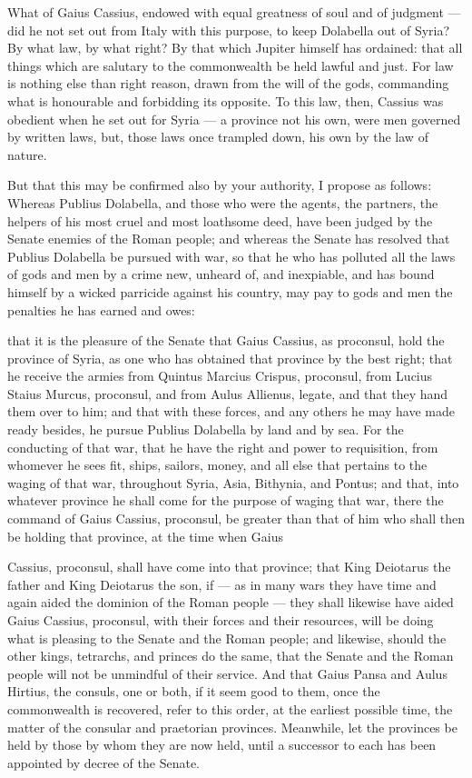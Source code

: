 What of Gaius Cassius, endowed with equal greatness of soul and of judgment --- did he not set out from Italy with this purpose, to keep Dolabella out of Syria? By what law, by what right? By that which Jupiter himself has ordained: that all things which are salutary to the commonwealth be held lawful and just. For law is nothing else than right reason, drawn from the will of the gods, commanding what is honourable and forbidding its opposite. To this law, then, Cassius was obedient when he set out for Syria --- a province not his own, were men governed by written laws, but, those laws once trampled down, his own by the law of nature.

 But that this may be confirmed also by your authority, I propose as follows: Whereas Publius Dolabella, and those who were the agents, the partners, the helpers of his most cruel and most loathsome deed, have been judged by the Senate enemies of the Roman people; and whereas the Senate has resolved that Publius Dolabella be pursued with war, so that he who has polluted all the laws of gods and men by a crime new, unheard of, and inexpiable, and has bound himself by a wicked parricide against his country, may pay to gods and men the penalties he has earned and owes:

 that it is the pleasure of the Senate that Gaius Cassius, as proconsul, hold the province of Syria, as one who has obtained that province by the best right; that he receive the armies from Quintus Marcius Crispus, proconsul, from Lucius Staius Murcus, proconsul, and from Aulus Allienus, legate, and that they hand them over to him; and that with these forces, and any others he may have made ready besides, he pursue Publius Dolabella by land and by sea. For the conducting of that war, that he have the right and power to requisition, from whomever he sees fit, ships, sailors, money, and all else that pertains to the waging of that war, throughout Syria, Asia, Bithynia, and Pontus; and that, into whatever province he shall come for the purpose of waging that war, there the command of Gaius Cassius, proconsul, be greater than that of him who shall then be holding that province, at the time when Gaius

 Cassius, proconsul, shall have come into that province; that King Deiotarus the father and King Deiotarus the son, if --- as in many wars they have time and again aided the dominion of the Roman people --- they shall likewise have aided Gaius Cassius, proconsul, with their forces and their resources, will be doing what is pleasing to the Senate and the Roman people; and likewise, should the other kings, tetrarchs, and princes do the same, that the Senate and the Roman people will not be unmindful of their service. And that Gaius Pansa and Aulus Hirtius, the consuls, one or both, if it seem good to them, once the commonwealth is recovered, refer to this order, at the earliest possible time, the matter of the consular and praetorian provinces. Meanwhile, let the provinces be held by those by whom they are now held, until a successor to each has been appointed by decree of the Senate.

